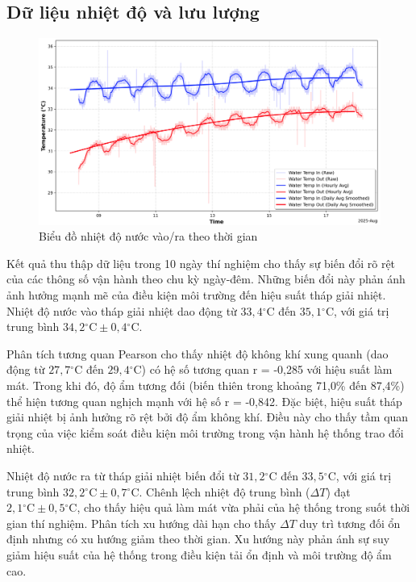 \documentclass[../main.tex]{subfiles}
\begin{document}
\subsection{Dữ liệu nhiệt độ và lưu lượng}
\label{sec:temperature_flow_data}

\begin{figure}[H]
    \centering
    \includegraphics[width=1\textwidth]{../Hinhve/nhiet_do_nuoc.png}
    \caption{Biểu đồ nhiệt độ nước vào/ra theo thời gian}
    \label{fig:water_temperature_chart}
\end{figure}

Kết quả thu thập dữ liệu trong 10 ngày thí nghiệm cho thấy sự biến đổi rõ rệt của các thông số vận hành theo chu kỳ ngày-đêm. Những biến đổi này phản ánh ảnh hưởng mạnh mẽ của điều kiện môi trường đến hiệu suất tháp giải nhiệt. Nhiệt độ nước vào tháp giải nhiệt dao động từ $33{,}4{^\circ\mathrm{C}}$ đến $35{,}1{^\circ\mathrm{C}}$, với giá trị trung bình $34{,}2{^\circ\mathrm{C}} \pm 0{,}4{^\circ\mathrm{C}}$.

Phân tích tương quan Pearson cho thấy nhiệt độ không khí xung quanh (dao động từ $27{,}7{^\circ\mathrm{C}}$ đến $29{,}4{^\circ\mathrm{C}}$) có hệ số tương quan r = -0,285 với hiệu suất làm mát. Trong khi đó, độ ẩm tương đối (biến thiên trong khoảng 71{,}0\% đến 87{,}4\%) thể hiện tương quan nghịch mạnh với hệ số r = -0,842. Đặc biệt, hiệu suất tháp giải nhiệt bị ảnh hưởng rõ rệt bởi độ ẩm không khí. Điều này cho thấy tầm quan trọng của việc kiểm soát điều kiện môi trường trong vận hành hệ thống trao đổi nhiệt.

Nhiệt độ nước ra từ tháp giải nhiệt biến đổi từ $31{,}2{^\circ\mathrm{C}}$ đến $33{,}5{^\circ\mathrm{C}}$, với giá trị trung bình $32{,}2{^\circ\mathrm{C}} \pm 0{,}7{^\circ\mathrm{C}}$. Chênh lệch nhiệt độ trung bình ($\Delta T$) đạt $2{,}1{^\circ\mathrm{C}} \pm 0{,}5{^\circ\mathrm{C}}$, cho thấy hiệu quả làm mát vừa phải của hệ thống trong suốt thời gian thí nghiệm. Phân tích xu hướng dài hạn cho thấy $\Delta T$ duy trì tương đối ổn định nhưng có xu hướng giảm theo thời gian. Xu hướng này phản ánh sự suy giảm hiệu suất của hệ thống trong điều kiện tải ổn định và môi trường độ ẩm cao.
\end{document}
